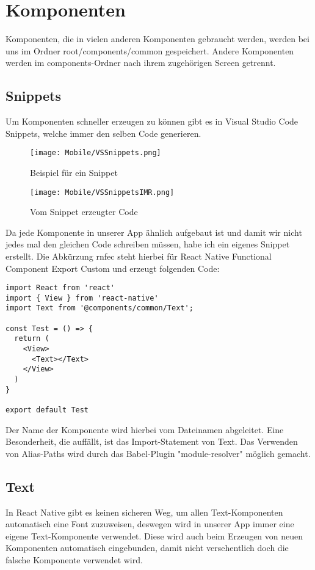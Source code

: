 \section{Komponenten}
Komponenten, die in vielen anderen Komponenten gebraucht werden, werden bei uns im Ordner
root/components/common gespeichert. Andere Komponenten werden im components-Ordner nach ihrem
zugehörigen Screen getrennt.

\subsection{Snippets}
Um Komponenten schneller erzeugen zu können gibt es in Visual Studio Code Snippets, welche immer den
selben Code generieren.

\begin{figure}[H]
  \begin{center}
    \texttt{[image: Mobile/VSSnippets.png]}
    \caption{Beispiel für ein Snippet}
  \end{center}
\end{figure}

\begin{figure}[H]
  \begin{center}
    \texttt{[image: Mobile/VSSnippetsIMR.png]}
    \caption{Vom Snippet erzeugter Code}
  \end{center}
\end{figure}

Da jede Komponente in unserer App ähnlich aufgebaut ist und damit wir nicht jedes mal den gleichen
Code schreiben müssen, habe ich ein eigenes Snippet erstellt. Die Abkürzung rnfec steht hierbei für
React Native Functional Component Export Custom und erzeugt folgenden Code:

\begin{lstlisting}
import React from 'react'
import { View } from 'react-native'
import Text from '@components/common/Text';

const Test = () => {
  return (
    <View>
      <Text></Text>
    </View>
  )
}

export default Test
\end{lstlisting}

Der Name der Komponente wird hierbei vom Dateinamen abgeleitet. Eine Besonderheit, die auffällt, ist
das Import-Statement von Text. Das Verwenden von Alias-Paths wird durch das Babel-Plugin
"module-resolver" möglich gemacht.

\newpage
\subsection{Text}
In React Native gibt es keinen sicheren Weg, um allen Text-Komponenten automatisch eine Font
zuzuweisen, deswegen wird in unserer App immer eine eigene Text-Komponente verwendet. Diese wird
auch beim Erzeugen von neuen Komponenten automatisch eingebunden, damit nicht versehentlich doch die
falsche Komponente verwendet wird.


